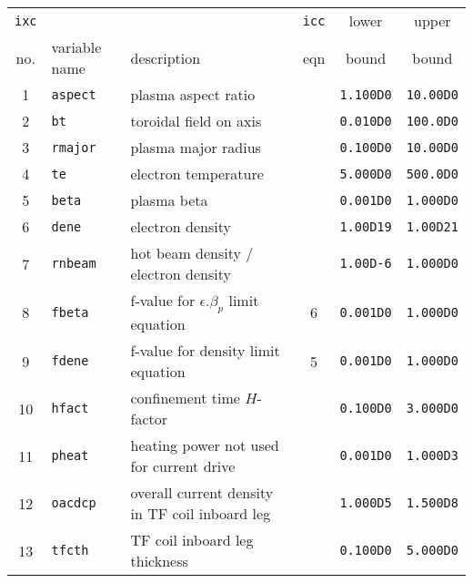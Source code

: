 \documentclass[11pt,a4paper]{report}
\begin{document}
\begin{table}[tbph]
\footnotesize
\begin{center}

\begin{tabular}{||c|l|l|c|c|c||} \hline
\texttt{ixc} &          &                                               & \texttt{icc} & lower        & upper       \\
no. & variable name     & description                                   & eqn & bound        & bound       \\ \hline
1   & \texttt{aspect}   & plasma aspect ratio                           &     & \texttt{1.100D0} & \texttt{10.00D0} \\
2   & \texttt{bt}       & toroidal field on axis                        &     & \texttt{0.010D0} & \texttt{100.0D0} \\
3   & \texttt{rmajor}   & plasma major radius                           &     & \texttt{0.100D0} & \texttt{10.00D0} \\
4   & \texttt{te}       & electron temperature                          &     & \texttt{5.000D0} & \texttt{500.0D0} \\
5   & \texttt{beta}     & plasma beta                                   &     & \texttt{0.001D0} & \texttt{1.000D0} \\
6   & \texttt{dene}     & electron density                              &     & \texttt{1.00D19} & \texttt{1.00D21} \\
7   & \texttt{rnbeam}   & hot beam density / electron density           &     & \texttt{1.00D-6} & \texttt{1.000D0} \\
8   & \texttt{fbeta}    & f-value for $\epsilon.\beta_p$ limit equation & 6   & \texttt{0.001D0} & \texttt{1.000D0} \\
9   & \texttt{fdene}    & f-value for density limit equation            & 5   & \texttt{0.001D0} & \texttt{1.000D0} \\
10  & \texttt{hfact}    & confinement time $H$-factor                   &     & \texttt{0.100D0} & \texttt{3.000D0} \\
11  & \texttt{pheat}    & heating power not used for current drive      &     & \texttt{0.001D0} & \texttt{1.000D3} \\
12  & \texttt{oacdcp}   & overall current density in TF coil inboard leg&     & \texttt{1.000D5} & \texttt{1.500D8} \\
13  & \texttt{tfcth}    & TF coil inboard leg thickness                 &     & \texttt{0.100D0} & \texttt{5.000D0} \\

\end{tabular}
\end{center}
\end{table}
\end{document}
